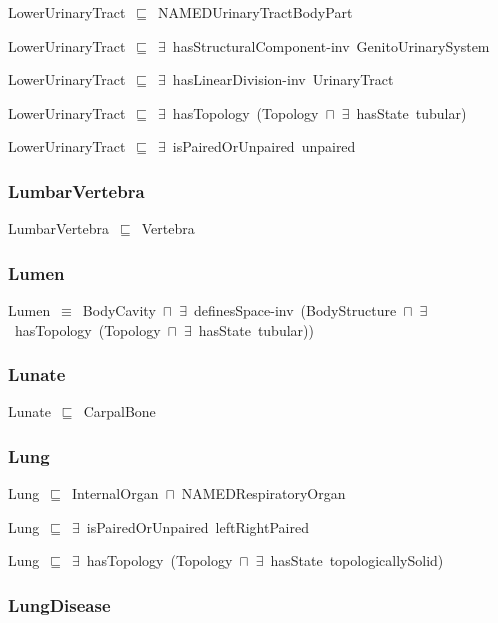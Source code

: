 \documentclass{article}
\begin{document}
LowerUrinaryTract~\ensuremath{\sqsubseteq}~NAMEDUrinaryTractBodyPart~

LowerUrinaryTract~\ensuremath{\sqsubseteq}~\ensuremath{\exists}~hasStructuralComponent-inv~GenitoUrinarySystem~

LowerUrinaryTract~\ensuremath{\sqsubseteq}~\ensuremath{\exists}~hasLinearDivision-inv~UrinaryTract~

LowerUrinaryTract~\ensuremath{\sqsubseteq}~\ensuremath{\exists}~hasTopology~(Topology~\ensuremath{\sqcap}~\ensuremath{\exists}~hasState~tubular)~

LowerUrinaryTract~\ensuremath{\sqsubseteq}~\ensuremath{\exists}~isPairedOrUnpaired~unpaired~

\subsubsection*{LumbarVertebra}

LumbarVertebra~\ensuremath{\sqsubseteq}~Vertebra~

\subsubsection*{Lumen}

Lumen~\ensuremath{\equiv}~BodyCavity~\ensuremath{\sqcap}~\ensuremath{\exists}~definesSpace-inv~(BodyStructure~\ensuremath{\sqcap}~\ensuremath{\exists}~hasTopology~(Topology~\ensuremath{\sqcap}~\ensuremath{\exists}~hasState~tubular))

\subsubsection*{Lunate}

Lunate~\ensuremath{\sqsubseteq}~CarpalBone~

\subsubsection*{Lung}

Lung~\ensuremath{\sqsubseteq}~InternalOrgan~\ensuremath{\sqcap}~NAMEDRespiratoryOrgan~

Lung~\ensuremath{\sqsubseteq}~\ensuremath{\exists}~isPairedOrUnpaired~leftRightPaired~

Lung~\ensuremath{\sqsubseteq}~\ensuremath{\exists}~hasTopology~(Topology~\ensuremath{\sqcap}~\ensuremath{\exists}~hasState~topologicallySolid)~

\subsubsection*{LungDisease}
\end{document}
